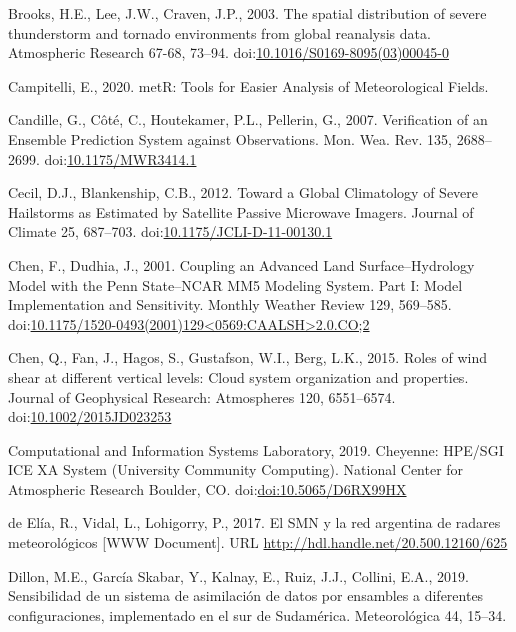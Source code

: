 \documentclass[final,5p,times,twocolumn,authoryear]{elsarticle} %
\begin{document}
\leavevmode\hypertarget{ref-brooks2003}{}%
Brooks, H.E., Lee, J.W., Craven, J.P., 2003. The spatial distribution of severe thunderstorm and tornado environments from global reanalysis data. Atmospheric Research 67-68, 73--94. doi:\href{https://doi.org/10.1016/S0169-8095(03)00045-0}{10.1016/S0169-8095(03)00045-0}

\leavevmode\hypertarget{ref-campitelli2020}{}%
Campitelli, E., 2020. metR: Tools for Easier Analysis of Meteorological Fields.

\leavevmode\hypertarget{ref-candille2007}{}%
Candille, G., Côté, C., Houtekamer, P.L., Pellerin, G., 2007. Verification of an Ensemble Prediction System against Observations. Mon. Wea. Rev. 135, 2688--2699. doi:\href{https://doi.org/10.1175/MWR3414.1}{10.1175/MWR3414.1}

\leavevmode\hypertarget{ref-cecil2012}{}%
Cecil, D.J., Blankenship, C.B., 2012. Toward a Global Climatology of Severe Hailstorms as Estimated by Satellite Passive Microwave Imagers. Journal of Climate 25, 687--703. doi:\href{https://doi.org/10.1175/JCLI-D-11-00130.1}{10.1175/JCLI-D-11-00130.1}

\leavevmode\hypertarget{ref-chen2001}{}%
Chen, F., Dudhia, J., 2001. Coupling an Advanced Land Surface--Hydrology Model with the Penn State--NCAR MM5 Modeling System. Part I: Model Implementation and Sensitivity. Monthly Weather Review 129, 569--585. doi:\href{https://doi.org/10.1175/1520-0493(2001)129\%3C0569:CAALSH\%3E2.0.CO;2}{10.1175/1520-0493(2001)129\textless0569:CAALSH\textgreater2.0.CO;2}

\leavevmode\hypertarget{ref-chen2015}{}%
Chen, Q., Fan, J., Hagos, S., Gustafson, W.I., Berg, L.K., 2015. Roles of wind shear at different vertical levels: Cloud system organization and properties. Journal of Geophysical Research: Atmospheres 120, 6551--6574. doi:\href{https://doi.org/10.1002/2015JD023253}{10.1002/2015JD023253}

\leavevmode\hypertarget{ref-Cheyenne2019}{}%
Computational and Information Systems Laboratory, 2019. Cheyenne: HPE/SGI ICE XA System (University Community Computing). National Center for Atmospheric Research Boulder, CO. doi:\href{https://doi.org/doi:10.5065/D6RX99HX}{doi:10.5065/D6RX99HX}

\leavevmode\hypertarget{ref-deelia2017}{}%
de Elía, R., Vidal, L., Lohigorry, P., 2017. El SMN y la red argentina de radares meteorológicos {[}WWW Document{]}. URL \url{http://hdl.handle.net/20.500.12160/625}

\leavevmode\hypertarget{ref-dillon2019}{}%
Dillon, M.E., García Skabar, Y., Kalnay, E., Ruiz, J.J., Collini, E.A., 2019. Sensibilidad de un sistema de asimilación de datos por ensambles a diferentes configuraciones, implementado en el sur de Sudamérica. Meteorológica 44, 15--34.
\end{document}
